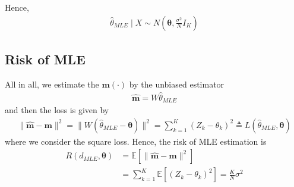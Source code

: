 \documentclass[11pt]{elegantbook}
\begin{document}
Hence,
\begin{equation}
    \begin{aligned}
        \hat{\theta}_{MLE}\mid X\sim N\left(\boldsymbol{\theta},\frac{\sigma^2}{N}I_K\right)
    \end{aligned}
    \nonumber
\end{equation}

\subsection{Risk of MLE}
All in all, we estimate the $\boldsymbol{m}(\cdot)$ by the unbiased estimator
\begin{equation}
    \begin{aligned}
        \hat{\boldsymbol{m}}=W\hat{\theta}_{MLE}
    \end{aligned}
    \nonumber
\end{equation}
and then the loss is given by
\begin{equation}
    \begin{aligned}
        \|\hat{\boldsymbol{m}}-\boldsymbol{m}\|^2=\|W(\hat{\theta}_{MLE}-\boldsymbol{\theta})\|^2=\sum_{k=1}^K(Z_k-\theta_k)^2\triangleq L(\hat{\theta}_{MLE},\boldsymbol{\theta})
    \end{aligned}
    \nonumber
\end{equation}
where we consider the square loss. Hence, the risk of MLE estimation is
\begin{equation}
    \begin{aligned}
        R(d_{MLE},\boldsymbol{\theta})&=\mathbb{E}[\|\hat{\boldsymbol{m}}-\boldsymbol{m}\|^2]\\
        &=\sum_{k=1}^K\mathbb{E}[(Z_k-\theta_k)^2]=\frac{K}{N}\sigma^2
    \end{aligned}
    \nonumber
\end{equation}
\end{document}
